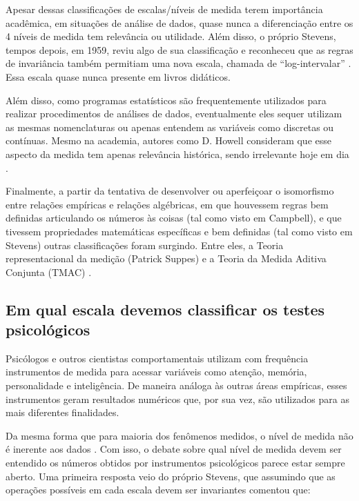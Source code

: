 \documentclass[
]{book}
\begin{document}
Apesar dessas classificações de escalas/níveis de medida terem importância acadêmica, em situações de análise de dados, quase nunca a diferenciação entre os 4 níveis de medida tem relevância ou utilidade. Além disso, o próprio Stevens, tempos depois, em 1959, reviu algo de sua classificação e reconheceu que as regras de invariância também permitiam uma nova escala, chamada de ``log-intervalar'' \citep{stevens1959}. Essa escala quase nunca presente em livros didáticos.

Além disso, como programas estatísticos são frequentemente utilizados para realizar procedimentos de análises de dados, eventualmente eles sequer utilizam as mesmas nomenclaturas ou apenas entendem as variáveis como discretas ou contínuas. Mesmo na academia, autores como D. Howell consideram que esse aspecto da medida tem apenas relevância histórica, sendo irrelevante hoje em dia \citep[p.~18]{howell2011}.

Finalmente, a partir da tentativa de desenvolver ou aperfeiçoar o isomorfismo entre relações empíricas e relações algébricas, em que houvessem regras bem definidas articulando os números às coisas (tal como visto em Campbell), e que tivessem propriedades matemáticas específicas e bem definidas (tal como visto em Stevens) outras classificações foram surgindo. Entre eles, a Teoria representacional da medição (Patrick Suppes) e a Teoria da Medida Aditiva Conjunta (TMAC) \citep{Michell1993}.

\hypertarget{em-qual-escala-devemos-classificar-os-testes-psicoluxf3gicos}{%
\subsection{Em qual escala devemos classificar os testes psicológicos}\label{em-qual-escala-devemos-classificar-os-testes-psicoluxf3gicos}}

Psicólogos e outros cientistas comportamentais utilizam com frequência instrumentos de medida para acessar variáveis como atenção, memória, personalidade e inteligência. De maneira análoga às outras áreas empíricas, esses instrumentos geram resultados numéricos que, por sua vez, são utilizados para as mais diferentes finalidades.

Da mesma forma que para maioria dos fenômenos medidos, o nível de medida não é inerente aos dados \citep{Velleman1993}. Com isso, o debate sobre qual nível de medida devem ser entendido os números obtidos por instrumentos psicológicos parece estar sempre aberto. Uma primeira resposta veio do próprio Stevens, que assumindo que as operações possíveis em cada escala devem ser invariantes comentou que:
\end{document}
